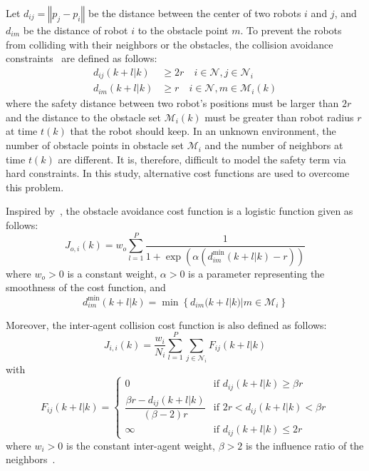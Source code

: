 Let $d_{ij}=\left\Vert p_j-p_i\right\Vert$ be the distance between the center of two robots $i$ and $j$, and $d_{im}$ be the distance of robot $i$ to the obstacle point $m$. To prevent the robots from colliding with their neighbors or the obstacles, the collision avoidance constraints~\cite{Soria2021,9145644,9938397} are defined as follows:
\begin{equation}
\begin{aligned}
    d_{ij}(k+l|k)&\geq 2r \quad i\in\mathcal{N},j\in\mathcal{N}_i\\
    d_{im}(k+l|k)&\geq r \quad i\in\mathcal{N}, m\in\mathcal{M}_i(k)
\end{aligned}
\end{equation}
where the safety distance between two robot's positions must be larger than $2r$ and the distance to the obstacle set $\mathcal{M}_i(k)$ must be greater than robot radius $r$ at time $t(k)$ that the robot should keep. In an unknown environment, the number of obstacle points in obstacle set $\mathcal{M}_{i}$ and the number of neighbors at time $t(k)$ are different. It is, therefore, difficult to model the safety term via hard constraints. In this study, alternative cost functions are used to overcome this problem.

Inspired by~\cite{580977,8202163}, the obstacle avoidance cost function is a logistic function given as follows:
\begin{equation}
    J_{o,i}(k) = w_o\sum_{l=1}^P \dfrac{1}{1 + \exp{\left(\alpha\left(d_{im}^\text{min}(k+l|k) - r\right)\right)}}
\end{equation}
where $w_o > 0$ is a constant weight, $\alpha > 0$ is a parameter representing the smoothness of the cost function, and
\begin{equation}
    d_{im}^\text{min}(k+l|k)=\min\left\{d_{im}(k+l|k)|m\in\mathcal{M}_i\right\}
\end{equation}

Moreover, the inter-agent collision cost function is also defined as follows:
\begin{equation}
    J_{i,i}(k)=\dfrac{w_i}{N_i}\sum_{l=1}^P{\sum_{j\in\mathcal{N}_i}}F_{ij}(k+l|k)
\end{equation}
with
\begin{equation}
    F_{ij}(k+l|k)=\begin{cases}
        0   & \text{if } d_{ij}(k+l|k) \geq \beta r\\
        \dfrac{\beta r-d_{ij}(k+l|k)}{(\beta-2)r}    & \text{if } 2r < d_{ij}(k+l|k) < \beta r\\
        \infty  & \text{if } d_{ij}(k+l|k) \leq 2r
    \end{cases}
\end{equation}
where $w_i>0$ is the constant inter-agent weight, $\beta>2$ is the influence ratio of the neighbors~\cite{736776}.

